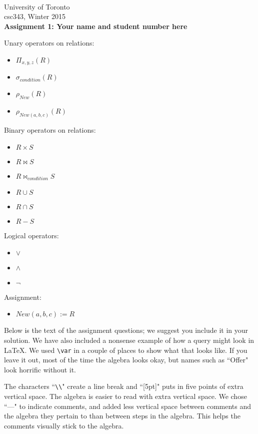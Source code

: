 \documentclass{article}
\newcommand{\var}[1]{\mathit{#1}}
\begin{document}
~~~\vspace{-2.0cm}

\noindent
University of Toronto\\
{\sc csc}343, Winter 2015\\[10pt]
{\LARGE\bf Assignment 1: Your name and student number here}

\noindent
Unary operators on relations:
\begin{itemize}
\item $\Pi_{x, y, z} (R)$
\item $\sigma_{condition} (R) $
\item $\rho_{New} (R) $
\item $\rho_{New(a, b, c)} (R) $
\end{itemize}
Binary operators on relations:
\begin{itemize}
\item $R \times S$
\item $R \bowtie S$
\item $R \bowtie_{condition} S$
\item $R \cup S$
\item $R \cap S$
\item $R - S$
\end{itemize}
Logical operators:
\begin{itemize}
\item $\vee$
\item $\wedge$
\item $\neg$
\end{itemize}
Assignment:
\begin{itemize}
\item $New(a, b, c) := R$
\end{itemize}

\noindent
Below is the text of the assignment questions; we suggest you include it in your solution.
We have also included a nonsense example of how a query might look in LaTeX.  
We used \verb|\var| in a couple of places to show what that looks like.  
If you leave it out, most of the time the algebra looks okay, but names
such as ``Offer" look horrific without it.

The characters ``\verb|\\|" create a line break and ``[5pt]" puts in 
five points of extra vertical space.  The algebra is easier to read with extra
vertical space.
We chose ``---" to indicate comments, and added less vertical space between comments
and the algebra they pertain to than between steps in the algebra.
This helps the comments visually stick to the algebra.
\end{document}
